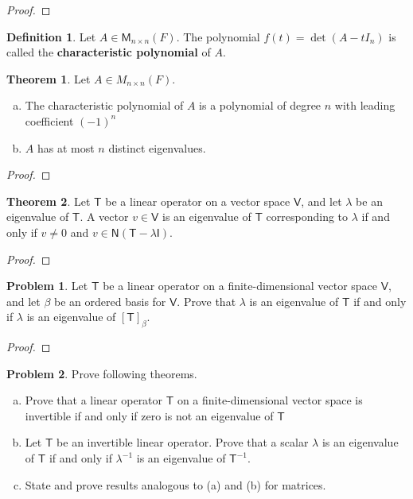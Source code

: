 \documentclass[12pt]{book}
\theoremstyle{definition}
\newtheorem{theorem}{Theorem}
\newtheorem{problem}{Problem}
\newtheorem{definition}{Definition}
\begin{document}
	\begin{proof}
	\end{proof}
	\newpage
	\begin{definition}
		Let $A\in \mathsf{M}_{n\times n}(F).$ The polynomial $f(t)=\det(A-t I_n)$ is called the \textbf{characteristic polynomial} of $A$.
	\end{definition}
	\newpage
	\begin{theorem}
		Let $A\in M_{n\times n}(F)$.\\
		\begin{enumerate}[(a)]
			\item The characteristic polynomial of $A$ is a polynomial of degree $n$ with leading coefficient $(-1)^n$
			\item $A$ has at most $n$ distinct eigenvalues.
		\end{enumerate}
	\end{theorem}
	\begin{proof}
	\end{proof}
	\newpage
	\begin{theorem}
		Let $\mathsf{T}$ be a linear operator on a vector space $\mathsf{V}$, and let $\lambda$ be an eigenvalue of $\mathsf{T}$. A vector $v\in \mathsf{V}$ is an eigenvalue of $\mathsf{T}$ corresponding to $\lambda$ if and only if $v\neq \mathit{0}$ and $v\in \mathsf{N}(\mathsf{T}-\lambda \mathsf{I})$.
	\end{theorem}
	\begin{proof}
	\end{proof}
	\newpage
	\begin{problem}
		Let $\mathsf{T}$ be a linear operator on a finite-dimensional vector space $\mathsf{V}$, and let $\beta$ be an ordered basis for $\mathsf{V}$. Prove that $\lambda$ is an eigenvalue of $\mathsf{T}$ if and only if $\lambda$ is an eigenvalue of $[\mathsf{T}]_\beta$.
	\end{problem}
	\begin{proof}
	\end{proof}
	\newpage
	\begin{problem} Prove following theorems.
		\begin{enumerate}[(a)]
			\item Prove that a linear operator $\mathsf{T}$ on a finite-dimensional vector space is invertible if and only if zero is not an eigenvalue of $\mathsf{T}$
			\item Let $\mathsf{T}$ be an invertible linear operator. Prove that a scalar $\lambda$ is an eigenvalue of $\mathsf{T}$ if and only if $\lambda^{-1}$ is an eigenvalue of $\mathsf{T}^{-1}$.
			\item State and prove results analogous to (a) and (b) for matrices.
		\end{enumerate}
	\end{problem}
\end{document}
